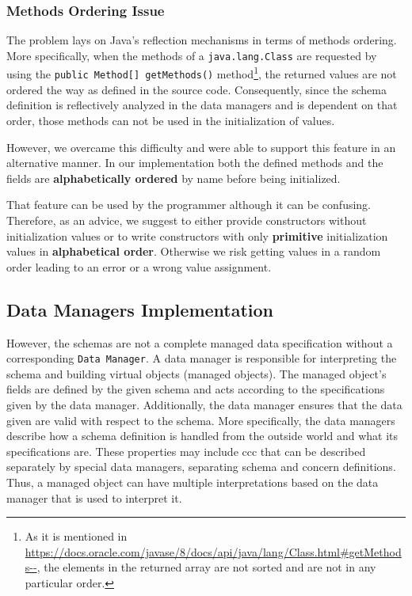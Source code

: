 \subsubsection{Methods Ordering Issue}\label{Methods ordering}
The problem lays on Java's reflection mechanisms in terms of methods ordering.
More specifically, when the methods of a \texttt{java.lang.Class} are requested by using the \texttt{public Method[] getMethods()} method\footnote{
	As it is mentioned in \url{https://docs.oracle.com/javase/8/docs/api/java/lang/Class.html\#getMethods--}, the elements in the returned array are not sorted and are not in any particular order.}, 
the returned values are not ordered the way as defined in the source code.
Consequently, since the schema definition is reflectively analyzed in the data managers and is dependent on that order, those methods can not be used in the initialization of values.

However, we overcame this difficulty and were able to support this feature in an alternative manner.
In our implementation both the defined methods and the fields are \textbf{alphabetically ordered} by name before being initialized.

That feature can be used by the programmer although it can be confusing.
Therefore, as an advice, we suggest to either provide constructors without initialization values or to write constructors with only \textbf{primitive} initialization values in \textbf{alphabetical order}.
Otherwise we risk getting values in a random order leading to an error or a wrong value assignment.

\subsection{Data Managers Implementation}\label{Data Managers Implementation}
However, the schemas are not a complete managed data specification without a corresponding \texttt{Data Manager}.
A data manager is responsible for interpreting the schema and building virtual objects (managed objects). 
The managed object's fields are defined by the given schema and acts according to the specifications given by the data manager.
Additionally, the data manager ensures that the data given are valid with respect to the schema.
More specifically, the data managers describe how a schema definition is handled from the outside world and what its specifications are.
These properties may include \ac{ccc} that can be described separately by special data managers, separating schema and concern definitions.
Thus, a managed object can have multiple interpretations based on the data manager that is used to interpret it.

